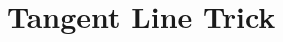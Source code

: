 \documentclass[inequalities.tex]{subfile}
\begin{document}
	
	\chapter{Tangent Line Trick}
	
\end{document}
